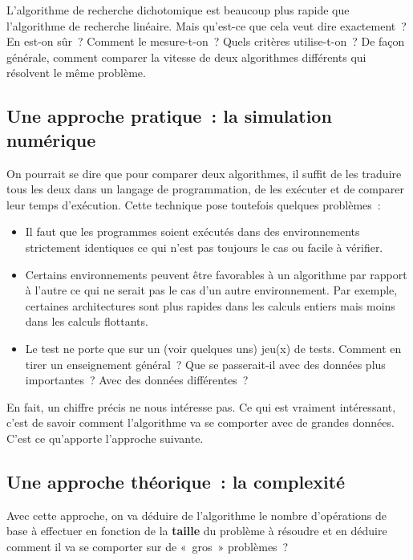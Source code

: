 		L’algorithme de recherche dichotomique 
		est beaucoup plus rapide que l’algorithme de recherche linéaire. 
		Mais qu’est-ce que cela veut dire exactement~? 
		En est-on sûr~? 
		Comment le mesure-t-on~? 
		Quels critères utilise-t-on~?
		De façon générale, comment comparer la vitesse
		de deux algorithmes différents qui résolvent le même problème.
		
		\subsection{Une approche pratique~: la simulation numérique}
	
			On pourrait se dire que pour comparer deux algorithmes, 
			il suffit de les traduire tous les deux 
			dans un langage de programmation, 
			de les exécuter et de comparer leur temps d’exécution. 
			Cette technique pose toutefois quelques problèmes~:			
			\begin{itemize}
				\item 
					Il faut que les programmes soient exécutés 
					dans des environnements strictement identiques 
					ce qui n’est pas toujours le cas ou facile à vérifier.
				\item
					Certains environnements peuvent être favorables
					à un algorithme par rapport à l’autre
					ce qui ne serait pas le cas d’un autre environnement.
					Par exemple, certaines architectures
					sont plus rapides dans les calculs entiers
					mais moins dans les calculs flottants.
				\item 
					Le test ne porte que sur un (voir quelques uns) jeu(x) de tests. 
					Comment en tirer un enseignement général~? 
					Que se passerait-il avec des données plus importantes~? 
					Avec des données différentes~?
			\end{itemize}		
			En fait, un chiffre précis ne nous intéresse pas. 
			Ce qui est vraiment intéressant,
			c’est de savoir comment l’algorithme va se comporter
			avec de grandes données.
			C’est ce qu’apporte l’approche suivante.
		
		\subsection{Une approche théorique~: la complexité}
		
			Avec cette approche,
			on va déduire de l’algorithme
			le nombre d’opérations de base à effectuer
			en fonction de la \textbf{taille} du problème à résoudre
			et en déduire 
			comment il va se comporter sur de «~gros~» problèmes~?
		
